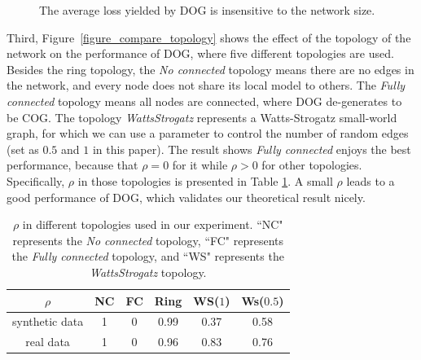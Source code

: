 \documentclass{article}
\begin{document}
\begin{figure}[!h]
\caption{The average loss yielded by DOG is insensitive to the network size.}
\label{figure_compare_network_size}
\end{figure}


Third, Figure~\ref{figure_compare_topology} shows the effect of the topology of the network on the performance of DOG, where five different topologies are used. Besides the ring topology, the \textit{No connected} topology means there are no edges in the network, and every node does not share its local model to others. The \textit{Fully connected} topology means all nodes are connected, where DOG de-generates to be COG. The topology  \textit{WattsStrogatz} represents a Watts-Strogatz small-world graph, for which we can use a parameter to control the number of random edges (set as $0.5$ and $1$ in this paper). The result shows \textit{Fully connected} enjoys the best performance, because that $\rho = 0$ for it while $\rho>0$ for other topologies. Specifically, $\rho$ in those topologies is presented in Table \ref{table_rho}. A small $\rho$ leads to a good performance of DOG, which validates our theoretical result nicely. 


\begin{table}[!]
\begin{tabular}{c|c|c|c|c|c}
\hline
$\rho$    & NC & FC & Ring & WS($1$) &  Ws($0.5$) \\ \hline  \hline
synthetic data & 1            & 0               &   0.99   &       0.37            &  0.58 \\ \hline
real data     & 1            & 0               &    0.96   &          0.83         &  0.76 \\ \hline
\end{tabular}
\caption{$\rho$ in different topologies used in our experiment. ``NC" represents the \textit{No connected} topology, ``FC" represents the \textit{Fully connected} topology, and ``WS" represents the \textit{WattsStrogatz} topology.}
\label{table_rho}
\end{table}
\end{document}
